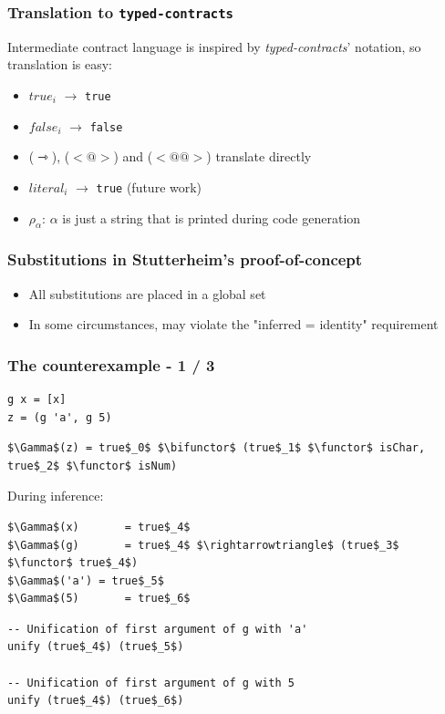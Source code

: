 \documentclass[]{beamer}
\makeatletter
\newcommand{\functor}{<\!\!\!@\!\!\!>}
\newcommand{\bifunctor}{<\!\!\!@\!\!@\!\!\!>}
\makeatother
\begin{document}
\begin{frame}
\frametitle{Translation to \texttt{typed-contracts}}

Intermediate contract language is inspired by \textit{typed-contracts}' notation, so translation is easy:

\begin{itemize}
	\item $true_i$ $\rightarrow$ \texttt{true}
	\item $false_i$ $\rightarrow$ \texttt{false}
	\item ($\rightarrowtriangle$), ($\functor$) and ($\bifunctor$) translate directly
	\item $literal_i$ $\rightarrow$ \texttt{true} (future work)
	\item $\rho_{\alpha}$: $\alpha$ is just a string that is printed during code generation
\end{itemize}

\end{frame}

\begin{frame}
\frametitle{Substitutions in Stutterheim's proof-of-concept}

\begin{itemize}
	\item All substitutions are placed in a global set
	\item In some circumstances, may violate the "inferred = identity" requirement
\end{itemize}

\end{frame}

\begin{frame}[fragile]
\frametitle{The counterexample - 1 / 3}

\begin{lstlisting}
g x = [x]
z = (g 'a', g 5)
\end{lstlisting}

\begin{lstlisting}[mathescape]
$\Gamma$(z) = true$_0$ $\bifunctor$ (true$_1$ $\functor$ isChar, true$_2$ $\functor$ isNum)
\end{lstlisting}

During inference: 

\begin{lstlisting}[mathescape]
$\Gamma$(x) 	  = true$_4$
$\Gamma$(g) 	  = true$_4$ $\rightarrowtriangle$ (true$_3$ $\functor$ true$_4$)
$\Gamma$('a') = true$_5$
$\Gamma$(5) 	  = true$_6$
\end{lstlisting}

\begin{lstlisting}[mathescape]
-- Unification of first argument of g with 'a'
unify (true$_4$) (true$_5$)

-- Unification of first argument of g with 5
unify (true$_4$) (true$_6$)
\end{lstlisting}

\end{frame}
\end{document}
